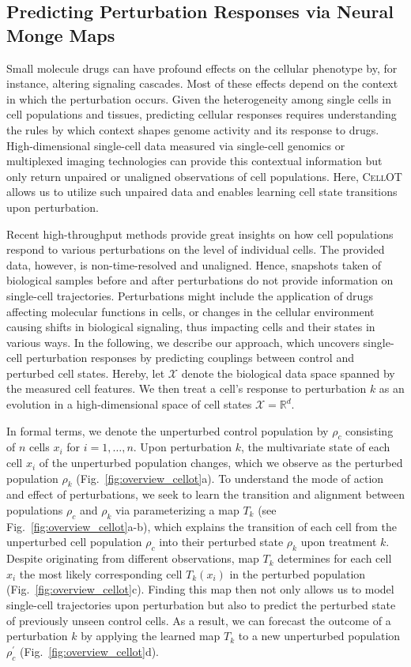 \subsection{Predicting Perturbation Responses via Neural Monge Maps}

Small molecule drugs can have profound effects on the cellular phenotype by, for instance, altering signaling cascades. Most of these effects depend on the context in which the perturbation occurs. Given the heterogeneity among single cells in cell populations and tissues, predicting cellular responses requires understanding the rules by which context shapes genome activity and its response to drugs. High-dimensional single-cell data measured via single-cell genomics or multiplexed imaging technologies can provide this contextual information but only return  unpaired or unaligned observations of cell populations. Here, \textsc{CellOT} allows us to utilize such unpaired data and enables learning cell state transitions upon perturbation.


Recent high-throughput methods provide great insights on how cell populations respond to various perturbations on the level of individual cells. The provided data, however, is non-time-resolved and unaligned. 
Hence, snapshots taken of biological samples before and after perturbations do not provide information on single-cell trajectories.
Perturbations might include the application of drugs affecting molecular functions in cells, or changes in the cellular environment causing shifts in biological signaling, thus impacting cells and their states in various ways.
In the following, we describe our approach, which uncovers single-cell perturbation responses by predicting couplings between control and perturbed cell states.
Hereby, let $\mathcal{X}$ denote the biological data space spanned by the measured cell features. We then treat a cell's response to perturbation $k$ as an evolution in a high-dimensional space of cell states $\mathcal{X} = \mathbb{R}^d$.


In formal terms, we denote the unperturbed control population by $\rho_c$ consisting of $n$ cells $x_i$ for $i = 1, \dots, n$. Upon perturbation $k$, the multivariate state of each cell $x_i$ of the unperturbed population changes, which we observe as the perturbed population $\rho_k$ (Fig.~\ref{fig:overview_cellot}a).
To understand the mode of action and effect of perturbations, we seek to learn the transition and alignment between populations $\rho_c$ and $\rho_k$ via parameterizing a map $T_k$ (see Fig.~\ref{fig:overview_cellot}a-b), which explains the transition of each cell from the unperturbed cell population $\rho_c$ into their perturbed state $\rho_k$ upon treatment $k$.
Despite originating from  different observations, map $T_k$ determines for each cell $x_i$ the most likely corresponding cell $T_k(x_i)$ in the perturbed population (Fig.~\ref{fig:overview_cellot}c).
Finding this map then not only allows us to model single-cell trajectories upon perturbation but also to predict the perturbed state of previously unseen control cells. As a result, we can forecast the outcome of a perturbation $k$  by applying the learned map $T_k$ to a new unperturbed population $\rho^\prime_c$ (Fig.~\ref{fig:overview_cellot}d).

